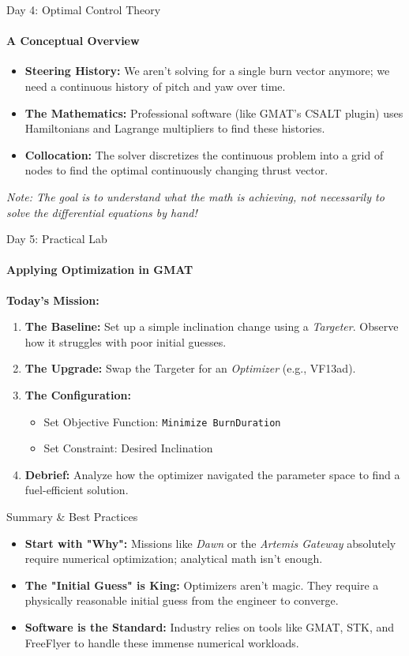 \documentclass[aspectratio=169]{beamer}
\begin{document}
\begin{frame}{Day 4: Optimal Control Theory}
    \framesubtitle{A Conceptual Overview}
    
    \begin{itemize}
        \item \textbf{Steering History:} We aren't solving for a single burn vector anymore; we need a continuous history of pitch and yaw over time.
        \item \textbf{The Mathematics:} Professional software (like GMAT's CSALT plugin) uses Hamiltonians and Lagrange multipliers to find these histories.
        \item \textbf{Collocation:} The solver discretizes the continuous problem into a grid of nodes to find the optimal continuously changing thrust vector.
    \end{itemize}
    \vspace{0.5cm}
    \textit{Note: The goal is to understand what the math is achieving, not necessarily to solve the differential equations by hand!}
\end{frame}

\begin{frame}{Day 5: Practical Lab}
    \framesubtitle{Applying Optimization in GMAT}
    
    \textbf{Today's Mission:}
    \begin{enumerate}
        \item \textbf{The Baseline:} Set up a simple inclination change using a \textit{Targeter}. Observe how it struggles with poor initial guesses.
        \item \textbf{The Upgrade:} Swap the Targeter for an \textit{Optimizer} (e.g., VF13ad).
        \item \textbf{The Configuration:} 
        \begin{itemize}
            \item Set Objective Function: \texttt{Minimize BurnDuration}
            \item Set Constraint: Desired Inclination
        \end{itemize}
        \item \textbf{Debrief:} Analyze how the optimizer navigated the parameter space to find a fuel-efficient solution.
    \end{enumerate}
\end{frame}

\begin{frame}{Summary \& Best Practices}
    \begin{itemize}
        \item \textbf{Start with "Why":} Missions like \textit{Dawn} or the \textit{Artemis Gateway} absolutely require numerical optimization; analytical math isn't enough.
        \item \textbf{The "Initial Guess" is King:} Optimizers aren't magic. They require a physically reasonable initial guess from the engineer to converge.
        \item \textbf{Software is the Standard:} Industry relies on tools like GMAT, STK, and FreeFlyer to handle these immense numerical workloads.
    \end{itemize}
\end{frame}
\end{document}
